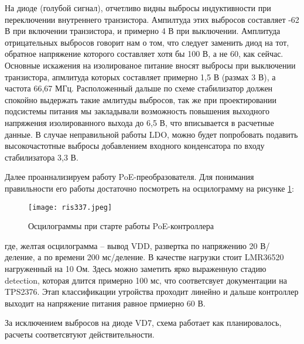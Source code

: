 На диоде (голубой сигнал), отчетливо видны выбросы индуктивности при переключении внутреннего транзистора. 
Ампилтуда этих выбросов составляет -62 В при включении транзистора, и примерно 4 В при выключении.
Амплитуда отрицательных выбросов говорит нам о том, что следует заменить диод на тот, обратное напряжение которого
составляет хотя бы 100 В, а не 60, как сейчас. Основные искажения на изолированое питание вносят выбросы при 
выключении транзистора, апмлитуда которых составляет примерно 1,5 В (размах 3 В), а частота 66,67 МГц. 
Расположенный дальше по схеме стабилизатор должен спокойно выдержать такие амлитуды выбросов, так же при
проектировании подсистемы питания мы закладывали возможность повышения выходного напряжения изолированного 
выхода до 6,5 В, что вписывается в расчетные данные. В случае неправильной работы LDO, можно будет попробовать
подавить высокочастотные выбросы добавлением входного конденсатора по входу стабилизатора 3,3 В.

Далее проаннализируем работу PoE-преобразователя. Для понимания правильности его работы достаточно посмотреть
на осцилограмму на рисунке \ref{ris:337}:

\begin{figure}[H]
    \centering
    \texttt{[image: ris337.jpeg]}
    \caption{Осцилограммы при старте работы PoE-контроллера}
    \label{ris:337}
\end{figure}

где, желтая осцилограмма -- вывод VDD, развертка по напряжению 20 В/деление, а по времени 200 мс/деление. 
В качестве нагрузки стоит LMR36520 нагруженный на 10 Ом.
Здесь можно заметить ярко выраженную стадию detection, которая длится 
примерно 100 мс, что соответсвует документации на TPS2376. Этап классификации утройства проходит линейно и 
дальше контроллер выходит на напряжение питания равное прмиерно 60 В. 

За исключением выбросов на диоде VD7, схема работает как планировалось, расчеты соответсвтуют действительности.
